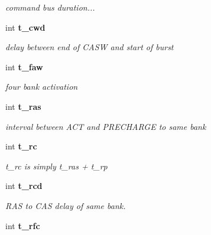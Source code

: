 \begin{CompactItemize}
\begin{CompactList}\small\item\em command bus duration... \item\end{CompactList}\item 
int {\bf t\_\-cwd}\label{class_d_r_a_msim_i_i_1_1_timing_specification_68acd8ce7e2b5077eaebf184290e5a67}

\begin{CompactList}\small\item\em delay between end of CASW and start of burst \item\end{CompactList}\item 
int {\bf t\_\-faw}\label{class_d_r_a_msim_i_i_1_1_timing_specification_8ee5adc74cf0f2301dc7869108eda169}

\begin{CompactList}\small\item\em four bank activation \item\end{CompactList}\item 
int {\bf t\_\-ras}\label{class_d_r_a_msim_i_i_1_1_timing_specification_f4f3f7f96d9be3b81092c999ababfb15}

\begin{CompactList}\small\item\em interval between ACT and PRECHARGE to same bank \item\end{CompactList}\item 
int {\bf t\_\-rc}\label{class_d_r_a_msim_i_i_1_1_timing_specification_45ae656450362b03c7e5fe2357eb74f6}

\begin{CompactList}\small\item\em t\_\-rc is simply t\_\-ras + t\_\-rp \item\end{CompactList}\item 
int {\bf t\_\-rcd}\label{class_d_r_a_msim_i_i_1_1_timing_specification_9cc88f875b6b3f6debf4d31eed6b2b9b}

\begin{CompactList}\small\item\em RAS to CAS delay of same bank. \item\end{CompactList}\item 
int {\bf t\_\-rfc}\label{class_d_r_a_msim_i_i_1_1_timing_specification_d9e93a1deeadfa60147a93c8553e991d}


\end{CompactItemize}
